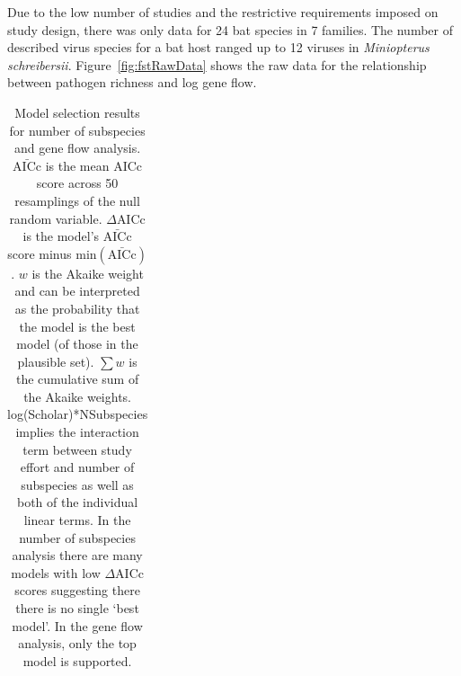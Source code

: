 Due to the low number of studies and the restrictive requirements imposed on study design, there was only data for 24 bat species in 7 families.
The number of described virus species for a bat host ranged up to 12 viruses in \emph{Miniopterus schreibersii}.
Figure~\ref{fig:fstRawData} shows the raw data for the relationship between pathogen richness and log gene flow.



\begin{table}[t]
\centering
\caption[Model selection results for number of subspecies analysis]{
Model selection results for number of subspecies and gene flow analysis. 
$\bar{\text{AICc}}$ is the mean AICc score across 50 resamplings of the null random variable. 
$\Delta$AICc is the model's $\bar{\text{AICc}}$ score minus $\text{min}(\bar{\text{AICc}})$. 
$w$ is the Akaike weight and can be interpreted as the probability that the model is the best model (of those in the plausible set).
$\sum w$ is the cumulative sum of the Akaike weights.
log(Scholar)*NSubspecies implies the interaction term between study effort and number of subspecies as well as both of the individual linear terms.
In the number of subspecies analysis there are many models with low $\Delta$AICc scores suggesting there there is no single `best model'.
In the gene flow analysis, only the top model is supported.
}

\begin{tabular}{@{}>{\footnotesize}p{8cm}rrrr@{}}


\end{tabular}
\end{table}
